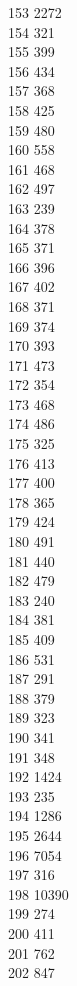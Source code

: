 { 153	2272 \\
 154	321 \\
 155	399 \\
 156	434 \\
 157	368 \\
 158	425 \\
 159	480 \\
 160	558 \\
 161	468 \\
 162	497 \\
 163	239 \\
 164	378 \\
 165	371 \\
 166	396 \\
 167	402 \\
 168	371 \\
 169	374 \\
 170	393 \\
 171	473 \\
 172	354 \\
 173	468 \\
 174	486 \\
 175	325 \\
 176	413 \\
 177	400 \\
 178	365 \\
 179	424 \\
 180	491 \\
 181	440 \\
 182	479 \\
 183	240 \\
 184	381 \\
 185	409 \\
 186	531 \\
 187	291 \\
 188	379 \\
 189	323 \\
 190	341 \\
 191	348 \\
 192	1424 \\
 193	235 \\
 194	1286 \\
 195	2644 \\
 196	7054 \\
 197	316 \\
 198	10390 \\
 199	274 \\
 200	411 \\
 201	762 \\
 202	847 \\
}
